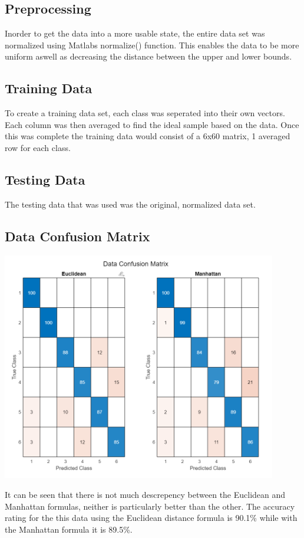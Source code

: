 \documentclass{article}
\begin{document}
\subsection{Preprocessing}

Inorder to get the data into a more usable state, the entire data set was
normalized using Matlabs normalize() function.  This enables the data to 
be more uniform aswell as decreasing the distance between the upper and 
lower bounds.

\subsection{Training Data}
To create a training data set, each class was seperated into their own vectors.
Each column was then averaged to find the ideal sample based on the data.  Once 
this was complete the training data would consist of a 6x60 matrix, 1 averaged
row for each class.

\subsection{Testing Data}
The testing data that was used was the original, normalized data set.

\subsection{Data Confusion Matrix}
\begin{center}
    {\includegraphics[height=10cm]{graphics/confuseddata.png}\centering}
\end{center}    
It can be seen that there is not much descrepency between the Euclidean 
and Manhattan formulas, neither is particularly better than the other.
The accuracy rating for the this data using the Euclidean distance formula
is 90.1\% while with the Manhattan formula it is 89.5\%.
\end{document}
